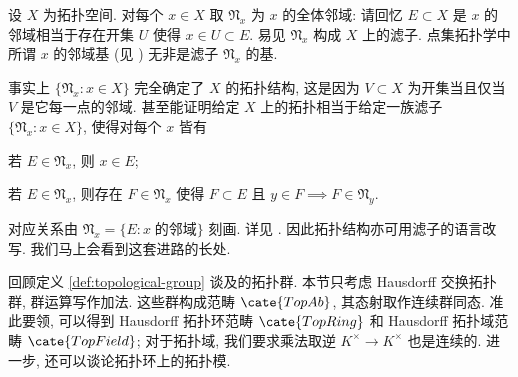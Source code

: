 \begin{example}\label{eg:nbd-filter}
	设 $X$ 为拓扑空间. 对每个 $x \in X$ 取 $\mathfrak{N}_x$ 为 $x$ 的全体邻域: 请回忆 $E \subset X$ 是 $x$ 的邻域相当于存在开集 $U$ 使得 $x \in U \subset E$. 易见 $\mathfrak{N}_x$ 构成 $X$ 上的滤子. 点集拓扑学中所谓 $x$ 的邻域基 (见 \cite[定义 2.6.3]{Xiong}) 无非是滤子 $\mathfrak{N}_x$ 的基.

	事实上 $\{ \mathfrak{N}_x : x \in X \}$ 完全确定了 $X$ 的拓扑结构, 这是因为 $V \subset X$ 为开集当且仅当 $V$ 是它每一点的邻域. 甚至能证明给定 $X$ 上的拓扑相当于给定一族滤子 $\{ \mathfrak{N}_x  : x \in X\}$, 使得对每个 $x$ 皆有
	\begin{compactitem}
		\item 若 $E \in \mathfrak{N}_x$, 则 $x \in E$;
		\item 若 $E \in \mathfrak{N}_x$, 则存在 $F \in \mathfrak{N}_x$ 使得 $F \subset E$ 且 $y \in F \implies F \in \mathfrak{N}_y$.
	\end{compactitem}
	对应关系由 $\mathfrak{N}_x = \{E : x\; \text{的邻域}\}$ 刻画. 详见 \cite[定理 2.3.3]{Xiong}. 因此拓扑结构亦可用滤子的语言改写. 我们马上会看到这套进路的长处.
\end{example}

回顾定义 \ref{def:topological-group} 谈及的拓扑群. 本节只考虑 Hausdorff 交换拓扑群, 群运算写作加法. 这些群构成范畴 $\cate{TopAb}$, 其态射取作连续群同态. 准此要领, 可以得到 Hausdorff 拓扑环范畴 $\cate{TopRing}$ 和 Hausdorff 拓扑域范畴 $\cate{TopField}$; 对于拓扑域, 我们要求乘法取逆 $K^\times \to K^\times$ 也是连续的. 进一步, 还可以谈论拓扑环上的拓扑模.   

